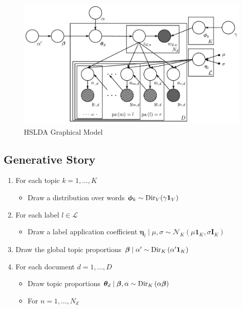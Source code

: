 \documentclass[portrait]{sciposter}
\begin{document}
\begin{multicols}{3}
\begin{figure}
\centering
\includegraphics[width=25cm]{Graphical_Model-final}
\small{\caption{HSLDA Graphical Model}}
\label{fig:graphical_model} 
\end{figure}

\subsection{Generative Story}

\begin{enumerate}
\item For each topic $k=1,\ldots,K$

\begin{itemize}
\item Draw a distribution over words $\boldsymbol\phi_{k}\sim{\rm Dir}_{V}(\gamma\mathbf{1}_V)$%
\end{itemize}
\item For each label $l\in\mathcal{L}$

\begin{itemize}
\item Draw a label application coefficient $\boldsymbol\eta_{l}\mid\mu,\sigma\sim\mathcal{N}_{K}(\mu \mathbf{1}_K,\sigma \mathbf{I}_{K})$  
\end{itemize}
\item Draw the global topic proportions $\boldsymbol\beta\mid\alpha'\sim{\rm Dir}_{K}\left(\alpha^{\prime}\mathbf{1}_K\right)$
\item For each document $d=1,\ldots,D$

\begin{itemize}
\item Draw topic proportions $\boldsymbol\theta_d\mid\boldsymbol\beta,\alpha\sim{\rm Dir}_{K}\left(\alpha\boldsymbol\beta\right)$ 
\item For $n=1,\ldots,N_{d}$


\end{itemize}
\end{enumerate}
\end{multicols}
\end{document}
